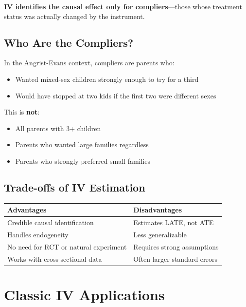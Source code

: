 \documentclass[
  letterpaper,
  DIV=11,
  numbers=noendperiod]{scrreprt}
\newcounter{none} %
\providecommand{\tightlist}{%
  \setlength{\itemsep}{0pt}\setlength{\parskip}{0pt}}
\begin{document}
\textbf{IV identifies the causal effect only for compliers}---those
whose treatment status was actually changed by the instrument.

\subsection{Who Are the Compliers?}\label{who-are-the-compliers}

In the Angrist-Evans context, compliers are parents who:

\begin{itemize}
\tightlist
\item
  Wanted mixed-sex children strongly enough to try for a third
\item
  Would have stopped at two kids if the first two were different sexes
\end{itemize}

This is \textbf{not}:

\begin{itemize}
\tightlist
\item
  All parents with 3+ children
\item
  Parents who wanted large families regardless
\item
  Parents who strongly preferred small families
\end{itemize}

\subsection{Trade-offs of IV
Estimation}\label{trade-offs-of-iv-estimation}

{\def\LTcaptype{none} %
\begin{longtable}[]{@{}ll@{}}
\toprule\noalign{}
Advantages & Disadvantages \\
\midrule\noalign{}
\endhead
\bottomrule\noalign{}
\endlastfoot
Credible causal identification & Estimates LATE, not ATE \\
Handles endogeneity & Less generalizable \\
No need for RCT or natural experiment & Requires strong assumptions \\
Works with cross-sectional data & Often larger standard errors \\
\end{longtable}
}

\section{Classic IV Applications}\label{classic-iv-applications}
\end{document}
